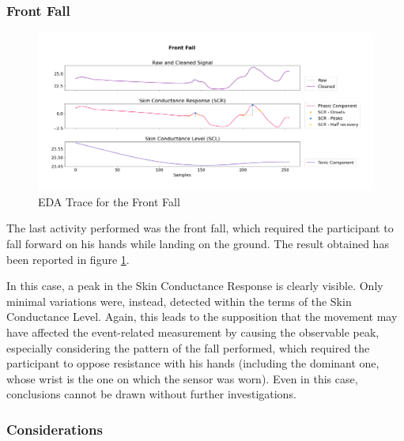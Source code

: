 \subsubsection{Front Fall}\label{subsubsec:front-fall}

\begin{figure}[H]
    \centering
    \includegraphics[width=\textwidth]{./images/movisens/Front.png}
    \caption{EDA Trace for the Front Fall}
    \label{fig:movisens-front}
\end{figure}

The last activity performed was the front fall, which required the participant to fall forward on his hands while landing on the ground. The result obtained has been reported in figure \ref{fig:movisens-front}.

In this case, a peak in the Skin Conductance Response is clearly visible. Only minimal variations were, instead, detected within the terms of the Skin Conductance Level. Again, this leads to the supposition that the movement may have affected the event-related measurement by causing the observable peak, especially considering the pattern of the fall performed, which required the participant to oppose resistance with his hands (including the dominant one, whose wrist is the one on which the sensor was worn). Even in this case, conclusions cannot be drawn without further investigations.

\subsubsection{Considerations}\label{subsubsec:further-observations}

